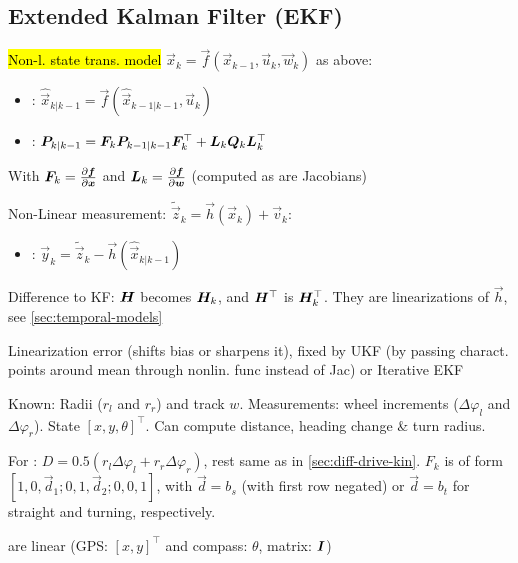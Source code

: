 \subsection{Extended Kalman Filter (EKF)}
\hl{Non-l. state trans. model} $\vec{x}_k = \vec{f}(\vec{x}_{k - 1}, \vec{u}_k, \vec{w}_k)$ as above:
\begin{itemize}
    \item {}: $\hat{\vec{x}}_{k | k - 1} = \vec{f}(\hat{\vec{x}}_{k - 1 | k - 1}, \vec{u}_k)$
    \item {}: $\bm{P}_{k | k - 1} = \bm{F}_k \bm{P}_{k - 1 | k - 1} \bm{F}_k^\top + \bm{L}_k \bm{Q}_k \bm{L}_k^\top$
\end{itemize}
With $\bm{F}_k = \frac{\partial \bm{f}}{\partial \bm{x}}$ and $\bm{L}_k = \frac{\partial \bm{f}}{\partial \bm{w}}$ (computed as are Jacobians)

 Non-Linear measurement: $\tilde{\vec{z}}_k = \vec{h}(\vec{x}_k) + \vec{v}_k$:
\begin{itemize}
    \item {}: $\vec{y}_k = \tilde{\vec{z}}_k - \vec{h}(\hat{\vec{x}}_{k | k - 1})$
\end{itemize}
Difference to KF: $\bm{H}$ becomes $\bm{H}_k$, and $\bm{H}^\top$ is $\bm{H}_k^\top$.
They are linearizations of $\vec{h}$, see \ref{sec:temporal-models}

 Linearization error (shifts bias or sharpens it), fixed by UKF (by passing charact. points around mean through nonlin. func instead of Jac) or Iterative EKF

 Known: Radii ($r_l$ and $r_r$) and track $w$. Measurements: wheel increments ($\Delta \varphi_l$ and $\Delta \varphi_r$).
State $[x, y, \theta]^\top$. Can compute distance, heading change \& turn radius.

For :
$D = 0.5(r_l \Delta \varphi_l + r_r \Delta \varphi_r)$, rest same as in \ref{sec:diff-drive-kin}.
$F_k$ is of form $[1, 0, \vec{d}_1; 0, 1, \vec{d}_2; 0, 0, 1]$, with $\vec{d} = b_s$ (with first row negated) or $\vec{d} = b_t$ for straight and turning, respectively.

 are linear (GPS: $[x, y]^\top$ and compass: $\theta$, matrix: $\bm{I}$)
